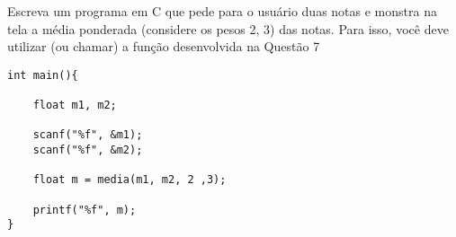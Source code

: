
\question[10]

Escreva um programa em C que pede para o usuário duas notas e monstra na tela a média ponderada (considere os pesos 2, 3) das notas. Para isso, você deve utilizar (ou chamar) a função desenvolvida na Questão 7

\begin{solution}
\begin{lstlisting}
int main(){
	
	float m1, m2;
	
	scanf("%f", &m1);
	scanf("%f", &m2);
	
	float m = media(m1, m2, 2 ,3);
	
	printf("%f", m);
} 
\end{lstlisting}
\end{solution}